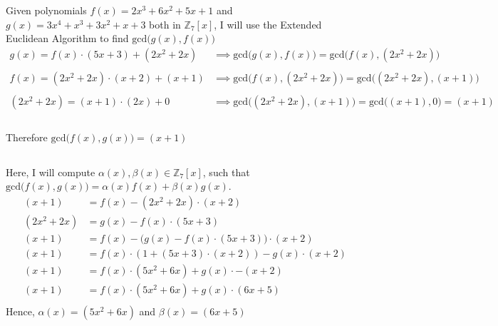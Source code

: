 \documentclass{article}
\begin{document}
\section{}
\subsection{}
Given polynomials 
$f(x) = 2x^3 + 6x^2 + 5x + 1$ and 
$g(x) = 3x^4 + x^3 + 3x^2 + x + 3$ both in 
$\mathbb{Z}_7[x]$, 
I will use the Extended Euclidean Algorithm to find $\textrm{gcd}\big(g(x), f(x)\big)$
\[
\begin{split}
g(x) = f(x) \cdot (5x + 3) + (2x^2 + 2x) &\implies \textrm{gcd}\big(g(x), f(x)\big) = \textrm{gcd}\big(f(x), (2x^2 + 2x)\big) \\ \\
f(x) = (2x^2 + 2x) \cdot (x + 2) + (x + 1) &\implies \textrm{gcd}\big(f(x), (2x^2 + 2x)\big) = \textrm{gcd}\big((2x^2+2x),(x+1)\big) \\ \\
(2x^2 + 2x) = (x+1) \cdot (2x) + 0 &\implies \textrm{gcd}\big((2x^2+2x),(x+1)\big) = \textrm{gcd}\big((x+1), 0\big) = (x+1)\\
\end{split}
\]
\\
Therefore $\textrm{gcd}\big(f(x), g(x)\big) = (x+1)$
\subsection{}
Here, I will compute $\alpha(x), \beta(x) \in \mathbb{Z}_7[x]$, such that
$\textrm{gcd}\big(f(x), g(x)\big) = \alpha(x)f(x) + \beta(x)g(x)$.
\[
\begin{split}
(x+1) &= f(x) - (2x^2+2x)\cdot(x+2) \\
(2x^2+2x) &= g(x) - f(x)\cdot(5x+3) \\
(x+1) &= f(x) - \big(g(x) - f(x)\cdot(5x+3)\big)\cdot(x+2) \\
(x+1) &= f(x)\cdot(1 + (5x+3)\cdot(x+2))-g(x)\cdot(x+2) \\
(x+1) &= f(x)\cdot(5x^2+6x) + g(x)\cdot -(x+2) \\
(x+1) &= f(x)\cdot(5x^2+6x) + g(x)\cdot (6x+5) \\
\end{split}
\]
Hence, $\alpha(x) = (5x^2+6x)$ and $\beta(x) = (6x+5)$
\section{}
\end{document}
